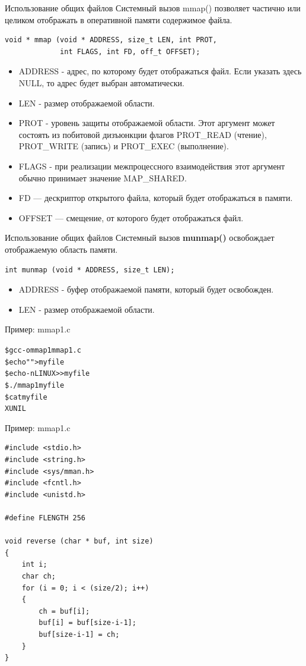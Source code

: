 \documentclass[xcolor=table]{beamer}
\begin{document}
\begin{frame}[fragile]{Использование общих файлов}
	Системный вызов mmap() позволяет частично или целиком отображать в оперативной памяти содержимое файла.
	\begin{verbatim}
void * mmap (void * ADDRESS, size_t LEN, int PROT,
             int FLAGS, int FD, off_t OFFSET);
	\end{verbatim}
	\begin{itemize}
		\item ADDRESS - адрес, по которому будет отображаться файл. Если указать здесь NULL, то адрес будет выбран автоматически.
		\item LEN - размер отображаемой области.
		\item PROT - уровень защиты отображаемой области. Этот аргумент может состоять из побитовой дизъюнкции флагов PROT\_READ (чтение), PROT\_WRITE (запись) и PROT\_EXEC (выполнение).
		\item FLAGS - при реализации межпроцессного взаимодействия этот аргумент обычно принимает значение MAP\_SHARED.
		\item FD — дескриптор открытого файла, который будет отображаться в памяти.
		\item OFFSET — смещение, от которого будет отображаться файл.
	\end{itemize}
\end{frame}

\begin{frame}[fragile]{Использование общих файлов}
	Системный вызов \textbf{munmap()} освобождает отображаемую область памяти.
	\begin{verbatim}
int munmap (void * ADDRESS, size_t LEN);
	\end{verbatim}
	\begin{itemize}
		\item ADDRESS - буфер отображаемой памяти, который будет освобожден.
		\item LEN - размер отображаемой области.
	\end{itemize}
	Пример: mmap1.c
	\begin{alltt}
\$ gcc -o mmap1 mmap1.c
\$ echo "" > myfile
\$ echo -n LINUX >> myfile
\$ ./mmap1 myfile
\$ cat myfile
XUNIL
	\end{alltt}
\end{frame}

\begin{frame}[fragile]{Пример: mmap1.c}
	\linespread{0.8}
	\begin{verbatim}
#include <stdio.h>
#include <string.h>
#include <sys/mman.h>
#include <fcntl.h>
#include <unistd.h>

#define FLENGTH 256

void reverse (char * buf, int size)
{
	int i;
	char ch;
	for (i = 0; i < (size/2); i++)
	{
		ch = buf[i];
		buf[i] = buf[size-i-1];
		buf[size-i-1] = ch;
	}
}
	\end{verbatim}
\end{frame}
\end{document}
